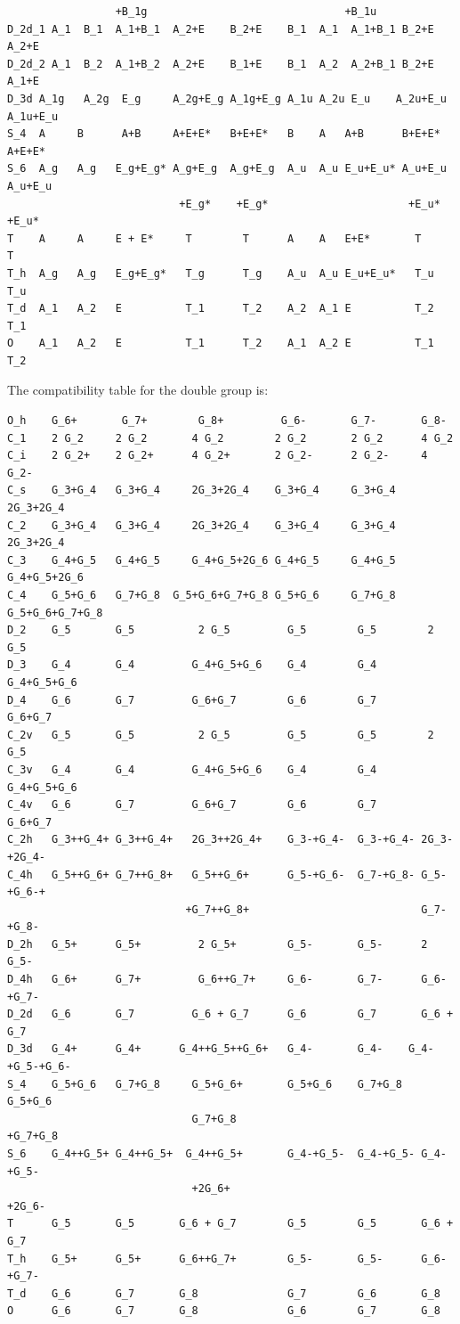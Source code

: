 \documentclass[12pt,a4paper]{article}
\begin{document}
\begin{verbatim}
                 +B_1g                               +B_1u 
D_2d_1 A_1  B_1  A_1+B_1  A_2+E    B_2+E    B_1  A_1  A_1+B_1 B_2+E   A_2+E
D_2d_2 A_1  B_2  A_1+B_2  A_2+E    B_1+E    B_1  A_2  A_2+B_1 B_2+E   A_1+E
D_3d A_1g   A_2g  E_g     A_2g+E_g A_1g+E_g A_1u A_2u E_u    A_2u+E_u A_1u+E_u 
S_4  A     B      A+B     A+E+E*   B+E+E*   B    A   A+B      B+E+E*   A+E+E* 
S_6  A_g   A_g   E_g+E_g* A_g+E_g  A_g+E_g  A_u  A_u E_u+E_u* A_u+E_u A_u+E_u
                           +E_g*    +E_g*                      +E_u*   +E_u*
T    A     A     E + E*     T        T      A    A   E+E*       T        T
T_h  A_g   A_g   E_g+E_g*   T_g      T_g    A_u  A_u E_u+E_u*   T_u      T_u
T_d  A_1   A_2   E          T_1      T_2    A_2  A_1 E          T_2      T_1
O    A_1   A_2   E          T_1      T_2    A_1  A_2 E          T_1      T_2
\end{verbatim}
The compatibility table for the double group is:
\begin{verbatim}
O_h    G_6+       G_7+        G_8+         G_6-       G_7-       G_8-
C_1    2 G_2     2 G_2       4 G_2        2 G_2       2 G_2      4 G_2
C_i    2 G_2+    2 G_2+      4 G_2+       2 G_2-      2 G_2-     4 G_2-
C_s    G_3+G_4   G_3+G_4     2G_3+2G_4    G_3+G_4     G_3+G_4   2G_3+2G_4
C_2    G_3+G_4   G_3+G_4     2G_3+2G_4    G_3+G_4     G_3+G_4   2G_3+2G_4
C_3    G_4+G_5   G_4+G_5     G_4+G_5+2G_6 G_4+G_5     G_4+G_5   G_4+G_5+2G_6
C_4    G_5+G_6   G_7+G_8  G_5+G_6+G_7+G_8 G_5+G_6     G_7+G_8 G_5+G_6+G_7+G_8
D_2    G_5       G_5          2 G_5         G_5        G_5        2 G_5
D_3    G_4       G_4         G_4+G_5+G_6    G_4        G_4       G_4+G_5+G_6
D_4    G_6       G_7         G_6+G_7        G_6        G_7       G_6+G_7
C_2v   G_5       G_5          2 G_5         G_5        G_5        2 G_5
C_3v   G_4       G_4         G_4+G_5+G_6    G_4        G_4       G_4+G_5+G_6
C_4v   G_6       G_7         G_6+G_7        G_6        G_7       G_6+G_7
C_2h   G_3++G_4+ G_3++G_4+   2G_3++2G_4+    G_3-+G_4-  G_3-+G_4- 2G_3-+2G_4- 
C_4h   G_5++G_6+ G_7++G_8+   G_5++G_6+      G_5-+G_6-  G_7-+G_8- G_5-+G_6-+
                            +G_7++G_8+                           G_7-+G_8- 
D_2h   G_5+      G_5+         2 G_5+        G_5-       G_5-      2 G_5-
D_4h   G_6+      G_7+         G_6++G_7+     G_6-       G_7-      G_6-+G_7-
D_2d   G_6       G_7         G_6 + G_7      G_6        G_7       G_6 + G_7
D_3d   G_4+      G_4+      G_4++G_5++G_6+   G_4-       G_4-    G_4-+G_5-+G_6-
S_4    G_5+G_6   G_7+G_8     G_5+G_6+       G_5+G_6    G_7+G_8   G_5+G_6
                             G_7+G_8                             +G_7+G_8
S_6    G_4++G_5+ G_4++G_5+  G_4++G_5+       G_4-+G_5-  G_4-+G_5- G_4-+G_5-
                             +2G_6+                               +2G_6-
T      G_5       G_5       G_6 + G_7        G_5        G_5       G_6 + G_7
T_h    G_5+      G_5+      G_6++G_7+        G_5-       G_5-      G_6-+G_7-
T_d    G_6       G_7       G_8              G_7        G_6       G_8
O      G_6       G_7       G_8              G_6        G_7       G_8    
\end{verbatim}
\end{document}

